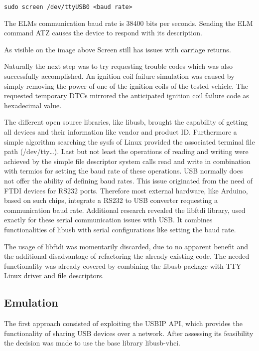 \begin{verbatim}
sudo screen /dev/ttyUSB0 <baud rate> 
\end{verbatim}

The ELMs communication baud rate is 38400 bits per seconds. Sending the ELM command ATZ causes the device to respond with its description.


As visible on the image above Screen still has issues with carriage returns.

Naturally the next step was to try requesting trouble codes which was also successfully accomplished. An ignition coil failure simulation was 
caused by simply removing the power of one of the ignition coils of the tested vehicle. The requested temporary DTCs mirrored the anticipated 
ignition coil failure code as hexadecimal value. 


The different open source libraries, like libusb, brought the capability of getting all devices and their information like vendor and product ID.
Furthermore a simple algorithm searching the sysfs of Linux provided the associated terminal file path (/dev/tty…). Last but not least the 
operations of reading and writing were achieved by the simple file descriptor system calls read and write in combination with termios for 
setting the baud rate of these operations. USB normally does not offer the ability of defining baud rates. This issue originated from the need 
of FTDI devices for RS232 ports. Therefore most external hardware, like Arduino, based on such chips, integrate a RS232 to USB converter 
requesting a communication baud rate. Additional research revealed the libftdi library, used exactly for these serial communication issues with 
USB. It combines functionalities of libusb with serial configurations like setting the baud rate. 

The usage of libftdi was momentarily discarded, due to no apparent benefit and the  additional disadvantage of refactoring the already existing 
code. The needed functionality was already covered by combining the libusb package with TTY Linux driver and file descriptors.

\subsection{Emulation}

The first approach consisted of exploiting the USBIP API, which provides the functionality of sharing USB devices over a network. After 
assessing its feasibility the decision was made to use the base library libusb-vhci.

